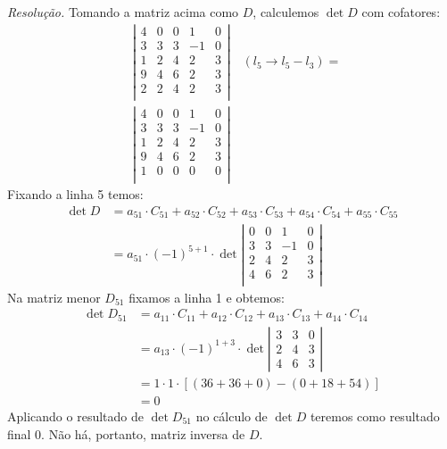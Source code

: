 \emph{Resolução.} Tomando a matriz acima como $D$, calculemos $\det D$ com cofatores:
\begin{align*}
    &\left|\begin{array}{ccccc}
        4 & 0 & 0 & 1 & 0 \\
        3 & 3 & 3 & -1 & 0 \\
        1 & 2 & 4 & 2 & 3 \\
        9 & 4 & 6 & 2 & 3 \\
        2 & 2 & 4 & 2 & 3 \\
    \end{array}\right| \quad (l_5 \rightarrow l_5 - l_3) = \\
    &\left|\begin{array}{ccccc}
        4 & 0 & 0 & 1 & 0 \\
        3 & 3 & 3 & -1 & 0 \\
        1 & 2 & 4 & 2 & 3 \\
        9 & 4 & 6 & 2 & 3 \\
        1 & 0 & 0 & 0 & 0 \\
    \end{array}\right|
\end{align*}
Fixando a linha 5 temos:
\begin{align*}
    \det D &= a_{51} \cdot C_{51} + a_{52} \cdot C_{52} + a_{53} \cdot C_{53} + a_{54} \cdot C_{54} + a_{55} \cdot C_{55} \\ &=
    a_{51} \cdot (-1)^{5 + 1} \cdot \det \left|\begin{array}{cccc}
         0 & 0 & 1 & 0  \\
         3 & 3 & -1 & 0 \\
         2 & 4 & 2 & 3 \\
         4 & 6 & 2 & 3 \\
    \end{array} \right|
\end{align*}
Na matriz menor $D_{51}$ fixamos a linha 1 e obtemos:
\begin{align*}
    \det D_{51} &= a_{11} \cdot C_{11} + a_{12} \cdot C_{12} + a_{13} \cdot C_{13} + a_{14} \cdot C_{14} \\ &=
    a_{13} \cdot (-1)^{1 + 3} \cdot \det 
    \left|\begin{array}{ccc}
         3 & 3& 0 \\
         2 & 4& 3 \\
         4 & 6 & 3
    \end{array}\right| \\ &=
    1 \cdot 1 \cdot [(36 + 36 + 0) - (0 + 18 + 54)] \\ &=
    0
\end{align*}
Aplicando o resultado de $\det D_{51}$ no cálculo de $\det D$ teremos como resultado final 0. Não há, portanto, matriz inversa de $D$.